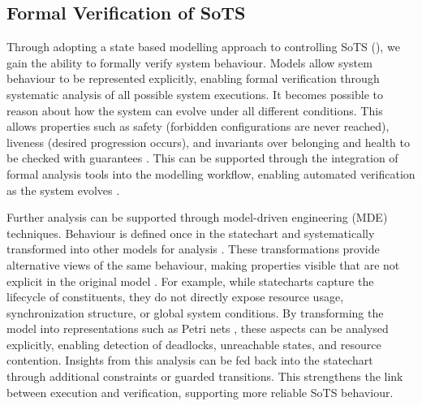 \subsection{Formal Verification of SoTS}
Through adopting a state based modelling approach to controlling SoTS (), we gain the ability to formally verify system behaviour. Models allow system behaviour to be represented explicitly, enabling formal verification through systematic analysis of all possible system executions. It becomes possible to reason about how the system can evolve under all different conditions. This allows properties such as safety (forbidden configurations are never reached), liveness (desired progression occurs), and invariants over belonging and health to be checked with guarantees \cite{henzinger2023quantitative}. This can be supported through the integration of formal analysis tools into the modelling workflow, enabling automated verification as the system evolves \cite{drusinsky2011modeling}.

Further analysis can be supported through model-driven engineering (MDE) techniques. Behaviour is defined once in the statechart and systematically transformed into other models for analysis \cite{biehl2010literature}. These transformations provide alternative views of the same behaviour, making properties visible that are not explicit in the original model \cite{bezivin2006model}. For example, while statecharts capture the lifecycle of constituents, they do not directly expose resource usage, synchronization structure, or global system conditions. By transforming the model into representations such as Petri nets \cite{cortadella1995synthesizing, hei2011automatic}, these aspects can be analysed explicitly, enabling detection of deadlocks, unreachable states, and resource contention. Insights from this analysis can be fed back into the statechart through additional constraints or guarded transitions. This strengthens the link between execution and verification, supporting more reliable SoTS behaviour.
